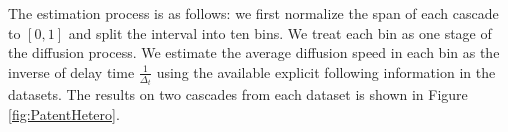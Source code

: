 The estimation process is as follows: we first normalize the span of each cascade to $[0,1]$ and split the interval into ten bins. We treat each bin as one stage of the diffusion process. We estimate the average diffusion speed in each bin as the inverse of delay time $\frac{1}{\Delta_t}$ using the available explicit following information in the datasets.  The results on two cascades from each dataset is shown in Figure \ref{fig:PatentHetero}. 
\begin{figure}[h]
\end{figure}
